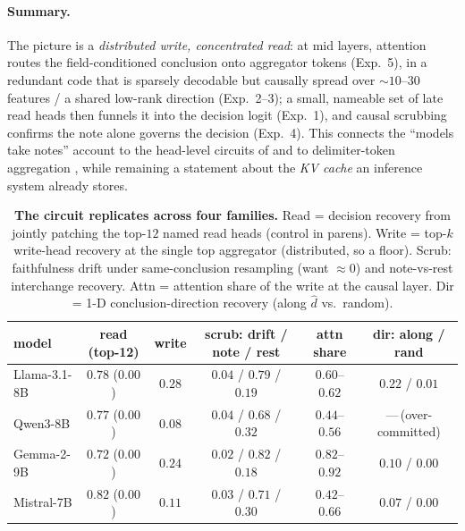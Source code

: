 \paragraph{Summary.} The picture is a \emph{distributed write, concentrated read}: at mid layers,
attention routes the field-conditioned conclusion onto aggregator tokens (Exp.\ 5), in a redundant code that is
sparsely decodable but causally spread over ${\sim}10$--$30$ features / a shared low-rank direction (Exp.\
2--3); a small, nameable set of late read heads then funnels it into the decision logit (Exp.\ 1), and
causal scrubbing confirms the note alone governs the decision (Exp.\ 4). This connects the
``models take notes'' account to the head-level circuits of \citet{wang2023ioi} and to delimiter-token
aggregation \citep{lindsey2025biology}, while remaining a statement about the \emph{KV cache} an inference
system already stores.

\begin{table}[t]
\centering\small
\caption{\textbf{The circuit replicates across four families.} Read = decision recovery from jointly
patching the top-$12$ named read heads (control in parens). Write = top-$k$ write-head recovery at the single
top aggregator (distributed, so a floor). Scrub: faithfulness drift under same-conclusion resampling
(want ${\approx}0$) and note-vs-rest interchange recovery. Attn = attention share of the write at the causal
layer. Dir = 1-D conclusion-direction recovery (along $\hat d$ vs.\ random).}
\label{tab:circuit}
\begin{tabular}{lccccc}
\toprule
model & read (top-12) & write & scrub: drift / note / rest & attn share & dir: along / rand \\
\midrule
Llama-3.1-8B & $0.78$ ($0.00$) & $0.28$ & $0.04$ / $0.79$ / $0.19$ & $0.60$--$0.62$ & $0.22$ / $0.01$ \\
Qwen3-8B     & $0.77$ ($0.00$) & $0.08$ & $0.04$ / $0.68$ / $0.32$ & $0.44$--$0.56$ & ---\,(over-committed) \\
Gemma-2-9B   & $0.72$ ($0.00$) & $0.24$ & $0.02$ / $0.82$ / $0.18$ & $0.82$--$0.92$ & $0.10$ / $0.00$ \\
Mistral-7B   & $0.82$ ($0.00$) & $0.11$ & $0.03$ / $0.71$ / $0.30$ & $0.42$--$0.66$ & $0.07$ / $0.00$ \\
\bottomrule
\end{tabular}
\end{table}

